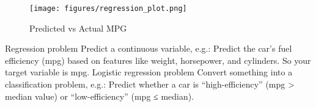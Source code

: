 \begin{figure}[h]
    \centering
    \texttt{[image: figures/regression\_plot.png]}
    \caption{Predicted vs Actual MPG}
\end{figure}

Regression problem
Predict a continuous variable, e.g.:
Predict the car’s fuel efficiency (mpg) based on features like weight, horsepower, and cylinders.
So your target variable is mpg.
Logistic regression problem
Convert something into a classification problem, e.g.:
Predict whether a car is “high-efficiency” (mpg > median value) or “low-efficiency” (mpg ≤ median).